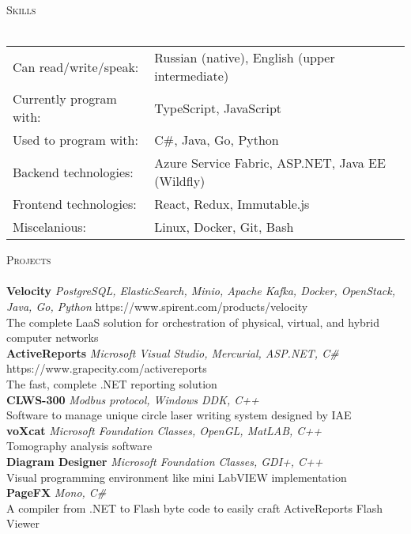 \documentclass[a4paper]{article}
\newcommand{\lineunder} {
    \vspace*{-8pt} \\
    \hspace*{-18pt} \hrulefill \\
}
\newcommand{\header} [1] {
    {\hspace*{-18pt}\vspace*{6pt} \textsc{#1}}
    \vspace*{-6pt} \lineunder
}
\begin{document}
\header{Skills}
\begin{tabular}{ l l }
	Can read/write/speak:   & Russian (native), English (upper intermediate)   \\
	Currently program with: & TypeScript, JavaScript                           \\
	Used to program with:   & C\#, Java, Go, Python                            \\
	Backend technologies:   & Azure Service Fabric, ASP.NET, Java EE (Wildfly) \\
	Frontend technologies:  & React, Redux, Immutable.js                       \\
	Miscelanious:           & Linux, Docker, Git, Bash                         \\
\end{tabular}
\vspace{2mm}

\header{Projects}
{\textbf{Velocity}} {\sl PostgreSQL, ElasticSearch, Minio, Apache Kafka, Docker, OpenStack, Java, Go, Python} \hfill https://www.spirent.com/products/velocity\\
The complete LaaS solution for orchestration of physical, virtual, and hybrid computer networks\\
\vspace*{2mm}
{\textbf{ActiveReports}} {\sl Microsoft Visual Studio, Mercurial, ASP.NET, C\#} \hfill https://www.grapecity.com/activereports\\
The fast, complete .NET reporting solution\\
\vspace*{2mm}
{\textbf{CLWS-300}} {\sl Modbus protocol, Windows DDK, C++} \\
Software to manage unique circle laser writing system designed by IAE\\
\vspace*{2mm}
{\textbf{voXcat}} {\sl Microsoft Foundation Classes, OpenGL, MatLAB, C++} \\
Tomography analysis software\\
\vspace*{2mm}
{\textbf{Diagram Designer}} {\sl Microsoft Foundation Classes, GDI+, C++} \\
Visual programming environment like mini LabVIEW implementation\\
\vspace*{2mm}
{\textbf{PageFX}} {\sl Mono, C\#} \\
A compiler from .NET to Flash byte code to easily craft ActiveReports Flash Viewer\\
\vspace*{2mm}



\ 
\end{document}
